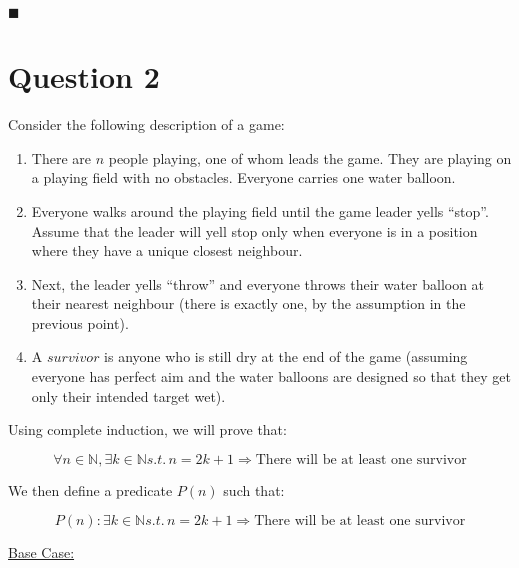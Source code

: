 \documentclass[20pt]{article}
\begin{document}
\hfill $\blacksquare$

\newpage

\section*{Question 2}

\begin{text}
    Consider the following description of a game:
\end{text}

\begin{enumerate}[label=(\alph*)]
    \item There are $n$ people playing, one of whom leads the game. They are playing on a playing field
with no obstacles. Everyone carries one water balloon.
    \item Everyone walks around the playing field until the game leader yells “stop”. Assume that the leader
will yell stop only when everyone is in a position where they have a unique closest neighbour.
    \item Next, the leader yells “throw” and everyone throws their water balloon at their nearest neighbour
(there is exactly one, by the assumption in the previous point).
    \item A $survivor$ is anyone who is still dry at the end of the game (assuming everyone has perfect aim
and the water balloons are designed so that they get only their intended target wet).
\end{enumerate}

\noindent 
\begin{text}
    Using complete induction, we will prove that:
\end{text}

\begin{equation}
    \forall n \in \mathbb{N}, \exists k \in \mathbb{N} s.t.\, n = 2k + 1 \Rightarrow \text{There will be at least one survivor} \nonumber
\end{equation}

\noindent 
\begin{text}
    We then define a predicate $P(n)$ such that:
\end{text}

\begin{equation}
    P(n): \exists k \in \mathbb{N} s.t.\, n = 2k + 1 \Rightarrow \text{There will be at least one survivor} \nonumber
\end{equation}

\noindent
\underline{Base Case:}
\end{document}
